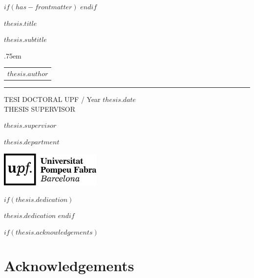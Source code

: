 $if(has-frontmatter)$
\frontmatter
$endif$


\begin{titlepage}
    \null\vfil
    \begin{flushleft}%
      {\LARGE \sffamily $thesis.title$ \par}%
      \vspace*{2cm}
      {\Large \sffamily $thesis.subtitle$ \par}%
      \vskip 1cm%
      {\large \lineskip .75em \begin{tabular}[t]{c} {\Huge $thesis.author$} \end{tabular}\par}
      \rule{\linewidth}{1mm} \par
      \vskip 1cm%
      {\large TESI DOCTORAL UPF / Year $thesis.date$}\\[2cm]
      {\normalsize THESIS SUPERVISOR}\par
      {\large $thesis.supervisor$}\par
      {\large $thesis.department$} \par
      \vspace{2cm}
     \centering
      \includegraphics[width=5cm]{logo_upf.png}
     \end{flushleft}\par
     \afterpage{\blankpage}
\end{titlepage}


\newpage


$if(thesis.dedication)$

\vspace*{\baselineskip}

\normalsize{$thesis.dedication$}
\newpage
\afterpage{\blankpage}
$endif$




$if(thesis.acknowledgements)$
\chapter{\sffamily Acknowledgements}

